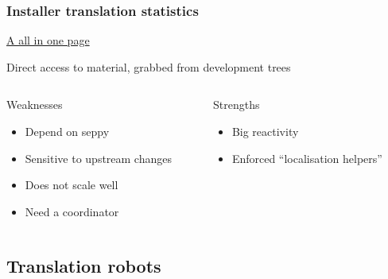\documentclass{beamer}
\begin{document}
\begin{frame}
  \frametitle{Installer translation statistics}
	\begin{block}
		{\href{http://people.debian.org/~seppy/d-i/translation-status.html}{A all in one page}}
	\end{block}
	\begin{block}
		{Direct access to material, grabbed from development trees}
	\end{block}
  \begin{columns}
    \begin{column}{4.5cm}
	\begin{block}
		{Weaknesses}
		\begin{itemize}
		\item
			Depend on seppy
		\item
			Sensitive to upstream changes
		\item
			Does not scale well
		\item
			Need a coordinator
		\end{itemize}
	\end{block}
    \end{column}
    \begin{column}{4.5cm}
	\begin{block}
		{Strengths}
		\begin{itemize}
		\item
			Big reactivity
		\item
			Enforced ``localisation helpers''
		\end{itemize}
	\end{block}
    \end{column}
  \end{columns}
\end{frame}


\subsection{Translation robots}
\end{document}
